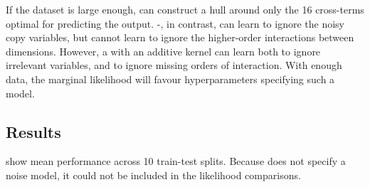 If the dataset is large enough, \HKL{} can construct a hull around only the 16 cross-terms optimal for predicting the output.
\gp{}-\SE{}, in contrast, can learn to ignore the noisy copy variables, but cannot learn to ignore the higher-order interactions between dimensions.
However, a \gp{} with an additive kernel can learn both to ignore irrelevant variables, and to ignore missing orders of interaction.
With enough data, the marginal likelihood will favour hyperparameters specifying such a model.
 
 
\subsection{Results}
 show mean performance across 10 train-test splits.
Because \HKL{} does not specify a noise model, it could not be included in the likelihood comparisons.

